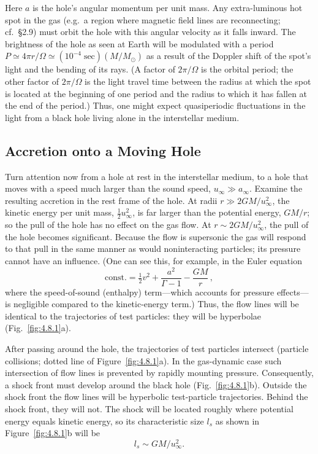 Here $a$ is the hole's angular momentum per unit mass. Any extra-luminous hot
spot in the gas (e.g.\ a region where magnetic field lines are reconnecting; cf.\
\S2.9) must orbit the hole with this angular velocity as it falls inward. The
brightness of the hole as seen at Earth will be modulated with a period
$P \simeq 4\pi r/\Omega \simeq (10^{-4}\;\text{sec})(M/M_\odot)$ as a result of the Doppler shift of the spot's
light and the bending of its rays. (A factor of $2\pi/\Omega$ is the orbital period; the
other factor of $2\pi/\Omega$ is the light travel time between the radius at which the
spot is located at the beginning of one period and the radius to which it has
fallen at the end of the period.) Thus, one might expect quasiperiodic
fluctuations in the light from a black hole living alone in the interstellar medium.


\subsection{Accretion onto a Moving Hole}
\label{sec:4.8}

Turn attention now from a hole at rest in the interstellar medium, to a hole that
moves with a speed much larger than the sound speed, $u_\infty \gg a_\infty$. Examine the
resulting accretion in the rest frame of the hole. At radii $r \gg 2GM/u_\infty^2$, the kinetic
energy per unit mass, $\frac{1}{2}u_\infty^2$, is far larger than the potential energy, $GM/r$; so the
pull of the hole has no effect on the gas flow. At $r \sim 2GM/u_\infty^2$, the pull of the
hole becomes significant. Because the flow is supersonic the gas will respond to
that pull in the same manner as would noninteracting particles; its pressure
cannot have an influence. (One can see this, for example, in the Euler equation
\begin{equation}
\text{const.} = \tfrac{1}{2}v^2 + \frac{a^2}{\Gamma - 1} - \frac{GM}{r}\,, \tag{4.8.1}
\end{equation}
where the speed-of-sound (enthalpy) term---which accounts for pressure effects---is
negligible compared to the kinetic-energy term.) Thus, the flow lines will be
identical to the trajectories of test particles: they will be hyperbolae
(Fig.~\ref{fig:4.8.1}a).

After passing around the hole, the trajectories of test particles intersect
(particle collisions; dotted line of Figure~\ref{fig:4.8.1}a). In the gas-dynamic case such
intersection of flow lines is prevented by rapidly mounting pressure. Con\-sequently,
a shock front must develop around the black hole (Fig.~\ref{fig:4.8.1}b).
Outside the shock front the flow lines will be hyperbolic test-particle trajectories.
Behind the shock front, they will not. The shock will be located roughly where
potential energy equals kinetic energy, so its characteristic size $l_s$ as shown in
Figure~\ref{fig:4.8.1}b will be
\begin{equation}
l_s \sim GM/u_\infty^2. \tag{4.8.2}
\end{equation}

